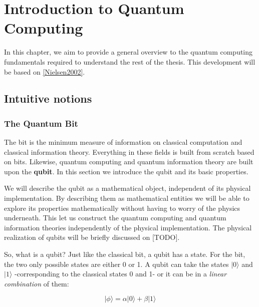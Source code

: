 
\chapter{Introduction to Quantum Computing}

In this chapter, we aim to provide a general overview to the quantum computing fundamentals required to understand the rest of the thesis. This development will be based on \ref{Nielsen2002}.

\section{Intuitive notions}

\subsection{The Quantum Bit}

The bit is the minimum measure of information on classical computation and classical information theory. Everything in these fields is built from scratch based on bits. Likewise, quantum computing and quantum information theory are built upon the \textbf{qubit}. In this section we introduce the qubit and its basic properties.

We will describe the qubit as a mathematical object, independent of its physical implementation. By describing them as mathematical entities we will be able to explore its properties mathematically without having to worry of the physics underneath. This let us construct the quantum computing and quantum information theories independently of the physical implementation. The physical realization of qubits will be briefly discussed on [TODO].

So, what is a qubit? Just like the classical bit, a qubit has a state. For the bit, the two only possible states are either 0 or 1. A qubit can take the states $|0\rangle$ and $|1\rangle$ -corresponding to the classical states 0 and 1- or it can be in a \emph{linear combination} of them:

$$ |\phi\rangle = \alpha |0\rangle + \beta |1\rangle $$

